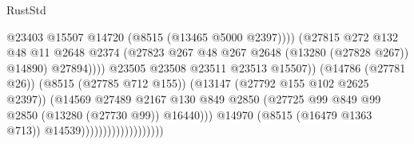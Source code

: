 \begin{lexlean}{RustStd}
\begin{coremodule}
                                                          @23403
                                                          @15507
                                                          @14720
                                                          (@8515 (@13465 @5000 @2397))))
                                                      (@27815
                                                        @272
                                                        @132
                                                        @48
                                                        @11
                                                        @2648
                                                        @2374
                                                        (@27823
                                                          @267
                                                          @48
                                                          @267
                                                          @2648
                                                          (@13280 (@27828 @267))
                                                          @14890)
                                                        @27894))))
                                                @23505
                                                @23508
                                                @23511
                                                @23513
                                                @15507))
                                            (@14786 (@27781 @26))
                                            (@8515 (@27785 @712 @155))
                                            (@13147 (@27792 @155 @102 @2625 @2397))
                                            (@14569
                                              @27489
                                              @2167
                                              @130
                                              @849
                                              @2850
                                              (@27725
                                                @99
                                                @849
                                                @99
                                                @2850
                                                (@13280 (@27730 @99))
                                                @16440)))
                                          @14970
                                          (@8515 (@16479 @1363 @713))
                                          @14539)))))))))))))))))))

\end{coremodule}
\end{lexlean}
